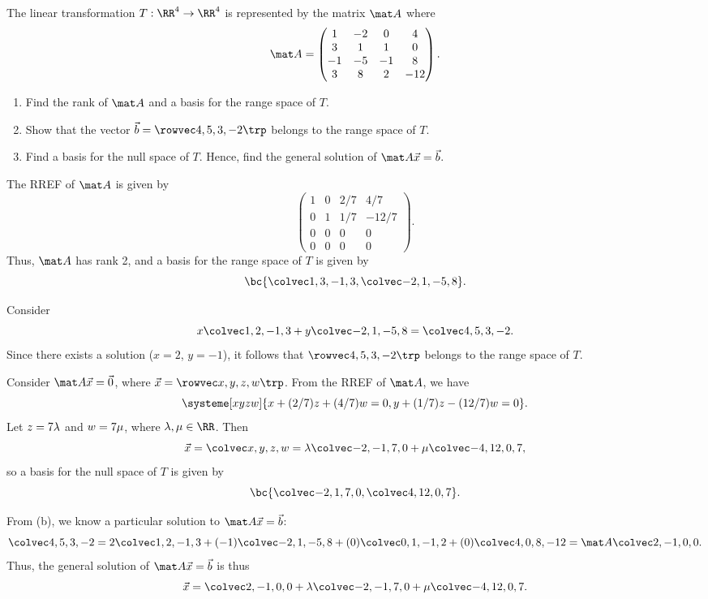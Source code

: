 \begin{problem}
    The linear transformation $T : \RR^4 \to \RR^4$ is represented by the matrix $\mat A$ where \[\mat A = \begin{pmatrix}1 & -2 & 0 & 4 \\ 3 & 1 & 1 & 0 \\ -1 & -5 & -1 & 8 \\ 3 & 8 & 2 & -12\end{pmatrix}.\]
    
    \begin{enumerate}
        \item Find the rank of $\mat A$ and a basis for the range space of $T$.
        \item Show that the vector $\vec b = \cvecivx453{-2}$ belongs to the range space of $T$.
        \item Find a basis for the null space of $T$. Hence, find the general solution of $\mat A \vec x = \vec b$.
    \end{enumerate}
\end{problem}
\begin{solution}
    \begin{ppart}
        The RREF of $\mat A$ is given by \[\begin{pmatrix}1 & 0 & 2/7 & 4/7 \\ 0 & 1 & 1/7 & -12/7 \\ 0 & 0 & 0 & 0 \\ 0 & 0 & 0 & 0\end{pmatrix}.\] Thus, $\mat A$ has rank 2, and a basis for the range space of $T$ is given by \[\bc{\cveciv13{-1}3, \cveciv{-2}1{-5}8}.\]
    \end{ppart}
    \begin{ppart}
        Consider \[x \cveciv12{-1}3 + y \cveciv{-2}{1}{-5}8 = \cveciv453{-2}.\] Since there exists a solution ($x = 2$, $y = -1$), it follows that $\cvecivx453{-2}$ belongs to the range space of $T$.
    \end{ppart}
    \begin{ppart}
        Consider $\mat A \vec x = \vec 0$, where $\vec x = \cvecivx{x}{y}{z}{w}$. From the RREF of $\mat A$, we have \[\systeme[xyzw]{x + (2/7)z + (4/7)w = 0, y + (1/7)z - (12/7) w = 0}.\] Let $z = 7\lambda$ and $w = 7\mu$, where $\l, \m \in \RR$. Then \[\vec x = \cveciv{x}{y}{z}{w} = \l \cveciv{-2}{-1}70 + \m \cveciv{-4}{12}07,\] so a basis for the null space of $T$ is given by \[\bc{\cveciv{-2}170, \cveciv4{12}07}.\]
        
        From (b), we know a particular solution to $\mat A \vec x = \vec b$: \[\cveciv453{-2} = 2 \cveciv12{-1}3 + (-1) \cveciv{-2}{1}{-5}8 + (0)\cveciv01{-1}2 + (0)\cveciv408{-12} = \mat A \cveciv2{-1}00.\] Thus, the general solution of $\mat A \vec x = \vec b$ is thus \[\vec x = \cveciv2{-1}00 + \l \cveciv{-2}{-1}70 + \m \cveciv{-4}{12}07.\]
    \end{ppart}
\end{solution}

